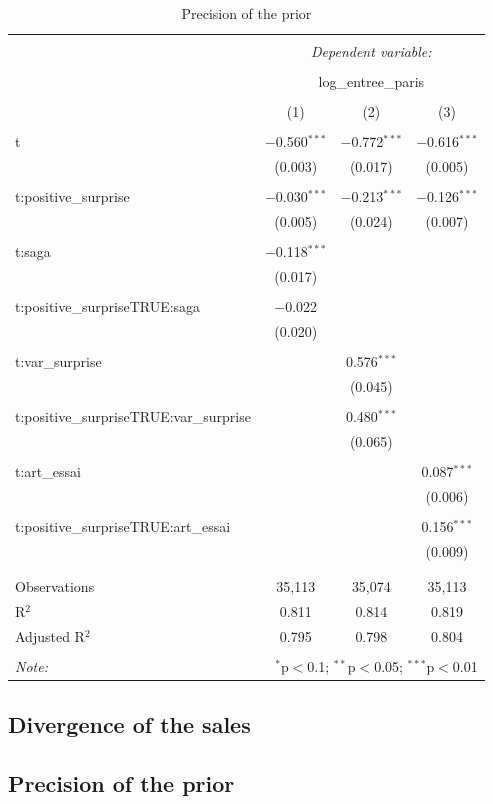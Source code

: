 \begin{table}[!htbp] \centering 
	\caption{Precision of the prior} 
	\label{} 
	\begin{tabular}{@{\extracolsep{5pt}}lccc} 
		\\[-1.8ex]\hline 
		\hline \\[-1.8ex] 
		& \multicolumn{3}{c}{\textit{Dependent variable:}} \\ 
		\cline{2-4} 
		\\[-1.8ex] & \multicolumn{3}{c}{log\_entree\_paris} \\ 
		\\[-1.8ex] & (1) & (2) & (3)\\ 
		\hline \\[-1.8ex] 
		t & $-$0.560$^{***}$ & $-$0.772$^{***}$ & $-$0.616$^{***}$ \\ 
		& (0.003) & (0.017) & (0.005) \\ 
		& & & \\ 
		t:positive\_surprise & $-$0.030$^{***}$ & $-$0.213$^{***}$ & $-$0.126$^{***}$ \\ 
		& (0.005) & (0.024) & (0.007) \\ 
		& & & \\ 
		t:saga & $-$0.118$^{***}$ &  &  \\ 
		& (0.017) &  &  \\ 
		& & & \\ 
		t:positive\_surpriseTRUE:saga & $-$0.022 &  &  \\ 
		& (0.020) &  &  \\ 
		& & & \\ 
		t:var\_surprise &  & 0.576$^{***}$ &  \\ 
		&  & (0.045) &  \\ 
		& & & \\ 
		t:positive\_surpriseTRUE:var\_surprise &  & 0.480$^{***}$ &  \\ 
		&  & (0.065) &  \\ 
		& & & \\ 
		t:art\_essai &  &  & 0.087$^{***}$ \\ 
		&  &  & (0.006) \\ 
		& & & \\ 
		t:positive\_surpriseTRUE:art\_essai &  &  & 0.156$^{***}$ \\ 
		&  &  & (0.009) \\ 
		& & & \\ 
		\hline \\[-1.8ex] 
		Observations & 35,113 & 35,074 & 35,113 \\ 
		R$^{2}$ & 0.811 & 0.814 & 0.819 \\ 
		Adjusted R$^{2}$ & 0.795 & 0.798 & 0.804 \\ 
		\hline 
		\hline \\[-1.8ex] 
		\textit{Note:}  & \multicolumn{3}{r}{$^{*}$p$<$0.1; $^{**}$p$<$0.05; $^{***}$p$<$0.01} \\ 
	\end{tabular} 
\end{table} 
\subsection{Divergence of the sales}
\subsection{Precision of the prior}
